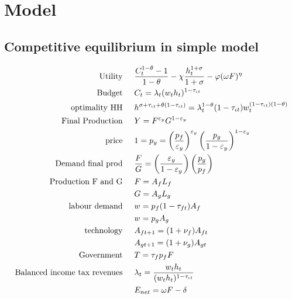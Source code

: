 \clearpage
\appendix
\section{Model}\label{app:model}
\subsection{Competitive equilibrium in simple model}

\begin{align}
\text{Utility}\hspace{5mm}& \frac{C_t^{1-\theta}-1}{1-\theta}-\chi \frac{h_t^{1+\sigma}}{1+\sigma}-\varphi(\omega F)^\eta\\
\text{Budget}\hspace{5mm}& C_t = \lambda_t(w_th_t)^{1-\tau_{\iota t}}\\
\text{optimality HH}\hspace{5mm}& h^{\sigma+\tau_{\iota t}+\theta(1-\tau_{\iota t})}=\lambda_t^{1-\theta}(1-\tau_{\iota t})w_t^{(1-\tau_{\iota t})(1-\theta)}\\
\text{Final Production}\hspace{5mm}&Y=F^{\varepsilon_y}G^{1-
	\varepsilon_y}\\ %
\text{price}\hspace{5mm}&1=p_y= \left(\frac{p_f}{\varepsilon_y}\right)^{\varepsilon_y}\left(\frac{p_g}{1-\varepsilon_y}\right)^{1-\varepsilon_y}\\
\text{Demand final prod}\hspace{5mm}&\frac{F}{G}=\left(\frac{\varepsilon_y}{1-\varepsilon_y}\right)\left(\frac{p_g}{p_f}\right)\\
\text{Production F and G}\hspace{5mm}&F=A_fL_f\\\
& G=A_gL_g\\
\text{labour demand}\hspace{5mm}& w=p_f(1-\tau_{ft})A_f\\
& w=p_gA_g\\
\text{technology}\hspace{5mm}&A_{ft+1}=(1+\nu_f)A_{ft}\\
&A_{gt+1}=(1+\nu_g)A_{gt}\\
\text{Government}\hspace{5mm}&T=\tau_{f}p_fF
\\
\text{Balanced income tax revenues}\hspace{5mm}&\lambda_t=\frac{w_t h_t}{(w_t h_t)^{1-\tau_{\iota t}}}\\
&E_{net}=\omega F-\delta
\end{align}

